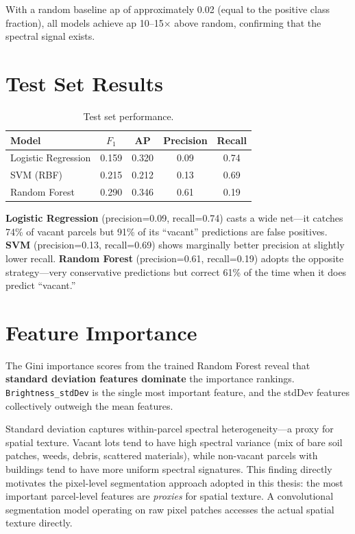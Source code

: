 With a random baseline \acrshort{ap} of approximately 0.02 (equal to the positive class fraction), all models achieve \acrshort{ap} 10--15$\times$ above random, confirming that the spectral signal exists.

\section{Test Set Results}

\begin{table}[htbp]
  \centering
  \caption{Test set performance.}
  \label{tab:test_results}
  \begin{tabular}{lcccc}
    \toprule
    \textbf{Model} & \textbf{$F_1$} & \textbf{AP} & \textbf{Precision} & \textbf{Recall} \\
    \midrule
    Logistic Regression & 0.159 & 0.320 & 0.09 & 0.74 \\
    SVM (RBF)           & 0.215 & 0.212 & 0.13 & 0.69 \\
    Random Forest       & 0.290 & 0.346 & 0.61 & 0.19 \\
    \bottomrule
  \end{tabular}
\end{table}

\textbf{Logistic Regression} (precision=0.09, recall=0.74) casts a wide net---it catches 74\% of vacant parcels but 91\% of its ``vacant'' predictions are false positives. \textbf{SVM} (precision=0.13, recall=0.69) shows marginally better precision at slightly lower recall. \textbf{Random Forest} (precision=0.61, recall=0.19) adopts the opposite strategy---very conservative predictions but correct 61\% of the time when it does predict ``vacant.''

\section{Feature Importance}

The Gini importance scores from the trained Random Forest reveal that \textbf{standard deviation features dominate} the importance rankings. \texttt{Brightness\_stdDev} is the single most important feature, and the stdDev features collectively outweigh the mean features.

Standard deviation captures within-parcel spectral heterogeneity---a proxy for spatial texture. Vacant lots tend to have high spectral variance (mix of bare soil patches, weeds, debris, scattered materials), while non-vacant parcels with buildings tend to have more uniform spectral signatures. This finding directly motivates the pixel-level segmentation approach adopted in this thesis: the most important parcel-level features are \emph{proxies} for spatial texture. A convolutional segmentation model operating on raw pixel patches accesses the actual spatial texture directly.

